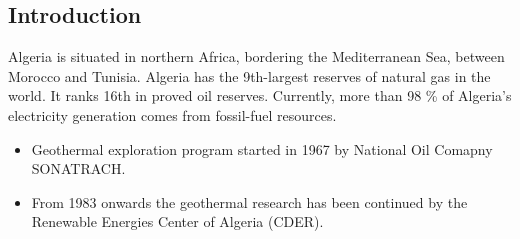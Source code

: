 \documentclass[a0,portrait]{a0poster}
\begin{document}
\vspace{1cm} %


\begin{multicols}{3} %


\color{Navy} %

\begin{abstract}
The electrical energy from renewables in Algeria contributed about 3.4\% (280 MW) in 2008 of a total power of 8.1 GWe and will reach 5\% by the year 2017 according to the Algerian Electricity and Gas Regulation Commission (CREG). The country’s target is reaching 40\% by 2030. The geothermal resources in Algeria are of low-enthalpy type. Most of these geothermal resources are located in the north of the country and generate a heat discharge of 240 MWt.
\end{abstract}

\color{Black} %
\section*{Introduction}
Algeria is situated in northern Africa, bordering the Mediterranean Sea, between Morocco and Tunisia. Algeria has the 9th-largest reserves of natural gas in the world. It ranks 16th in proved oil reserves. Currently, more than 98 \% of Algeria's electricity generation comes from fossil-fuel resources. 
\begin{itemize}
\item Geothermal exploration program started in 1967 by National Oil Comapny SONATRACH.
\item From 1983 onwards the geothermal research has been continued by the Renewable Energies Center of Algeria (CDER).
\end{itemize}


\end{multicols}
\end{document}
